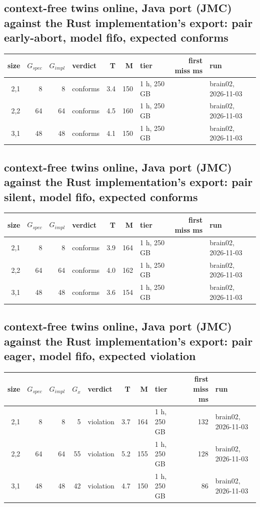 \documentclass[10pt]{article}
\begin{document}
\subsection*{context-free twins online, Java port (JMC) against the Rust implementation's export: pair \textsf{early-abort}, model fifo, expected conforms}
\begin{longtable}{@{}rrrlrrlrl@{}}
\toprule
size & $G_{\mathit{spec}}$ & $G_{\mathit{impl}}$ & verdict & T & M & tier & first miss ms & run \\
\midrule
\endhead
\color{red} 2,1 & 8 & 8 & conforms & 3.4 & 150 & 1 h, 250 GB &  & brain02, 2026-11-03 \\
\color{red} 2,2 & 64 & 64 & conforms & 4.5 & 160 & 1 h, 250 GB &  & brain02, 2026-11-03 \\
\color{red} 3,1 & 48 & 48 & conforms & 4.1 & 150 & 1 h, 250 GB &  & brain02, 2026-11-03 \\
\bottomrule
\end{longtable}
\subsection*{context-free twins online, Java port (JMC) against the Rust implementation's export: pair \textsf{silent}, model fifo, expected conforms}
\begin{longtable}{@{}rrrlrrlrl@{}}
\toprule
size & $G_{\mathit{spec}}$ & $G_{\mathit{impl}}$ & verdict & T & M & tier & first miss ms & run \\
\midrule
\endhead
\color{red} 2,1 & 8 & 8 & conforms & 3.9 & 164 & 1 h, 250 GB &  & brain02, 2026-11-03 \\
\color{red} 2,2 & 64 & 64 & conforms & 4.0 & 162 & 1 h, 250 GB &  & brain02, 2026-11-03 \\
\color{red} 3,1 & 48 & 48 & conforms & 3.6 & 154 & 1 h, 250 GB &  & brain02, 2026-11-03 \\
\bottomrule
\end{longtable}
\subsection*{context-free twins online, Java port (JMC) against the Rust implementation's export: pair \textsf{eager}, model fifo, expected violation}
\begin{longtable}{@{}rrrrlrrlrl@{}}
\toprule
size & $G_{\mathit{spec}}$ & $G_{\mathit{impl}}$ & $G_x$ & verdict & T & M & tier & first miss ms & run \\
\midrule
\endhead
\color{red} 2,1 & 8 & 8 & 5 & violation & 3.7 & 164 & 1 h, 250 GB & 132 & brain02, 2026-11-03 \\
\color{blue} 2,2 & 64 & 64 & 55 & violation & 5.2 & 155 & 1 h, 250 GB & 128 & brain02, 2026-11-03 \\
\color{blue} 3,1 & 48 & 48 & 42 & violation & 4.7 & 150 & 1 h, 250 GB & 86 & brain02, 2026-11-03 \\
\bottomrule
\end{longtable}
\end{document}
